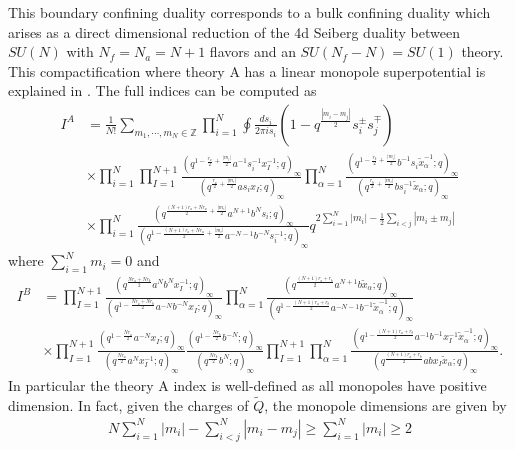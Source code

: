 \documentclass[12pt]{article}
\numberwithin{equation}{section}
\begin{document}
This boundary confining duality corresponds to a bulk confining duality which arises as a direct dimensional reduction of the 4d Seiberg duality between $SU(N)$ with $N_f = N_a = N + 1$ flavors and an $SU(N_f - N) = SU(1)$ theory. This compactification where theory A has a linear monopole superpotential is explained in \cite{Aharony:2013dha}. 
The full indices can be computed as
\begin{align}
\label{suN_N+1_N+1_fullA}
I^A&=\frac{1}{N!}
\sum_{m_1,\cdots,m_N\in \mathbb{Z}}
\prod_{i=1}^N
\oint \frac{ds_i}{2\pi is_i}
(1-q^{\frac{|m_i-m_j|}{2}} s_i^{\pm}s_j^{\mp})
\nonumber\\
&\times 
\prod_{i=1}^N 
\prod_{I=1}^{N+1}
\frac{
(q^{1-\frac{r_a}{2}+\frac{|m_i|}{2}} a^{-1} s_i^{-1} x_I^{-1};q)_{\infty}
}{
(q^{\frac{r_a}{2}+\frac{|m_i|}{2}} a s_i x_I;q)_{\infty}
}
\prod_{\alpha=1}^{N}
\frac{
(q^{1-\frac{r_b}{2}+\frac{|m_i|}{2}} b^{-1} s_i \tilde{x}_{\alpha}^{-1};q)_{\infty}
}{
(q^{\frac{r_b}{2}+\frac{|m_i|}{2}} b s_i^{-1} \tilde{x}_\alpha;q)_{\infty}
}
\nonumber\\
&\times 
\prod_{i=1}^N
\frac{
(q^{\frac{(N+1)r_a+Nr_a}{2}+\frac{|m_i|}{2}} a^{N+1} b^Ns_i;q)_{\infty}
}
{
(q^{1-\frac{(N+1)r_a+Nr_a}{2}+\frac{|m_i|}{2}} a^{-N-1} b^{-N}s_i^{-1};q)_{\infty}
}q^{ 2\sum_{i=1}^N |m_i|-\frac12\sum_{i<j}|m_i\pm m_j|}
\end{align}
where $\sum_{i=1}^N m_i=0$ and 
\begin{align}
\label{suN_N+1_N+1_fullB}
I^B&=
\prod_{I=1}^{N+1}
\frac{
(q^{\frac{Nr_a+Nr_b}{2}}a^Nb^Nx_I^{-1};q)_{\infty}
}
{
(q^{1-\frac{Nr_a+Nr_b}{2}}a^{-N}b^{-N}x_I;q)_{\infty}
}
\prod_{\alpha=1}^{N}
\frac{
(q^{\frac{(N+1)r_a+r_b}{2}}a^{N+1} b \tilde{x}_{\alpha};q)_{\infty}
}
{
(q^{1-\frac{(N+1)r_a+r_b}{2}}a^{-N-1} b^{-1} \tilde{x}_{\alpha}^{-1};q)_{\infty}
}
\nonumber\\
&\times 
\prod_{I=1}^{N+1}
\frac{
(q^{1-\frac{Nr_a}{2}} a^{-N} x_I;q )_{\infty}
}
{
(q^{\frac{Nr_a}{2}} a^{N} x_I^{-1};q )_{\infty}
}
\frac{
(q^{1-\frac{Nr_b}{2}} b^{-N};q )_{\infty}
}
{
(q^{\frac{Nr_b}{2}} b^N;q )_{\infty}
}
\prod_{I=1}^{N+1}
\prod_{\alpha=1}^{N}
\frac{
(q^{1-\frac{(N+1)r_a+r_b}{2}} a^{-1}b^{-1} x_I^{-1} \tilde{x}_{\alpha}^{-1};q )_{\infty}
}
{
(q^{\frac{(N+1)r_a+r_b}{2}} ab x_I \tilde{x}_{\alpha};q )_{\infty}
}.
\end{align}
In particular the theory A index is well-defined as all monopoles have positive dimension. In fact, given the charges of $\tilde{Q}$, the monopole dimensions are given by
\begin{align}
\label{Mono_Ch_suN_Np1}
    N \sum_{i=1}^N |m_i| - \sum_{i < j}^N |m_i - m_j| \ge \sum_{i=1}^N |m_i| \ge 2
\end{align}
\end{document}
